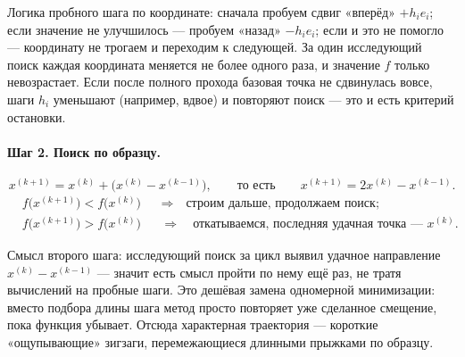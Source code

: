 \begin{idea}
Логика пробного шага по координате: сначала пробуем сдвиг «вперёд» $+h_i e_i$;
если значение не улучшилось — пробуем «назад» $-h_i e_i$; если и это не помогло —
координату не трогаем и переходим к следующей. За один исследующий поиск каждая
координата меняется не более одного раза, и значение $f$ только невозрастает.
Если после полного прохода базовая точка не сдвинулась вовсе, шаги $h_i$
уменьшают (например, вдвое) и повторяют поиск — это и есть критерий остановки.
\end{idea}

\paragraph{Шаг 2. Поиск по образцу.}
\[
  x^{(k+1)} = x^{(k)} + \big(x^{(k)} - x^{(k-1)}\big) ,
  \qquad\text{то есть}\qquad
  x^{(k+1)} = 2x^{(k)} - x^{(k-1)} .
\]
\[
  \begin{aligned}
    &f\big(x^{(k+1)}\big) < f\big(x^{(k)}\big)
     &&\Longrightarrow\quad \text{строим дальше, продолжаем поиск;} \\
    &f\big(x^{(k+1)}\big) > f\big(x^{(k)}\big)
     &&\Longrightarrow\quad
       \text{откатываемся, последняя удачная точка — } x^{(k)} .
  \end{aligned}
\]


\begin{idea}
Смысл второго шага: исследующий поиск за цикл выявил удачное направление
$x^{(k)} - x^{(k-1)}$ — значит есть смысл пройти по нему ещё раз, не тратя
вычислений на пробные шаги. Это дешёвая замена одномерной минимизации: вместо
подбора длины шага метод просто повторяет уже сделанное смещение, пока функция
убывает. Отсюда характерная траектория — короткие «ощупывающие» зигзаги,
перемежающиеся длинными прыжками по образцу.
\end{idea}
